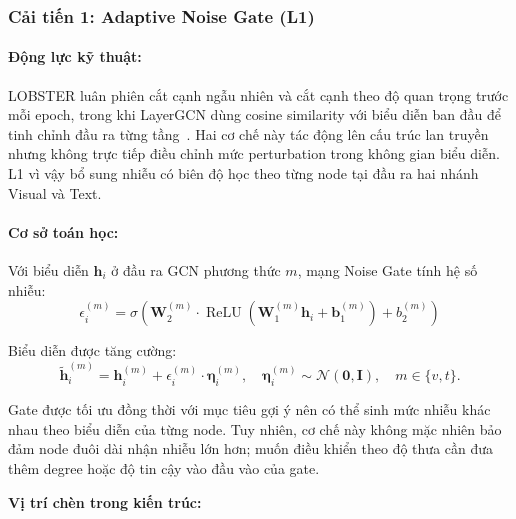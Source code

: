 \subsubsection{Cải tiến 1: Adaptive Noise Gate (L1)}

\paragraph{Động lực kỹ thuật:}
LOBSTER luân phiên cắt cạnh ngẫu nhiên và cắt cạnh theo độ quan trọng trước mỗi epoch, trong khi LayerGCN dùng cosine similarity với biểu diễn ban đầu để tinh chỉnh đầu ra từng tầng~\cite{xu2026lobster}. Hai cơ chế này tác động lên cấu trúc lan truyền nhưng không trực tiếp điều chỉnh mức perturbation trong không gian biểu diễn. L1 vì vậy bổ sung nhiễu có biên độ học theo từng node tại đầu ra hai nhánh Visual và Text.

\paragraph{Cơ sở toán học:}
Với biểu diễn $\mathbf{h}_i$ ở đầu ra GCN phương thức $m$, mạng Noise Gate tính hệ số nhiễu:
\begin{equation}
\epsilon_i^{(m)} = \sigma\!\left(\mathbf{W}_2^{(m)} \cdot \operatorname{ReLU}\!\left(\mathbf{W}_1^{(m)} \mathbf{h}_i + \mathbf{b}_1^{(m)}\right) + b_2^{(m)}\right)
\end{equation}

Biểu diễn được tăng cường:
\begin{equation}
\tilde{\mathbf{h}}_i^{(m)} = \mathbf{h}_i^{(m)} + \epsilon_i^{(m)} \cdot \boldsymbol{\eta}_i^{(m)},
\quad \boldsymbol{\eta}_i^{(m)} \sim \mathcal{N}(\mathbf{0}, \mathbf{I}),
\quad m\in\{v,t\}.
\end{equation}

Gate được tối ưu đồng thời với mục tiêu gợi ý nên có thể sinh mức nhiễu khác nhau theo biểu diễn của từng node. Tuy nhiên, cơ chế này không mặc nhiên bảo đảm node đuôi dài nhận nhiễu lớn hơn; muốn điều khiển theo độ thưa cần đưa thêm degree hoặc độ tin cậy vào đầu vào của gate.

\par\medskip
\noindent\textbf{Vị trí chèn trong kiến trúc:}\par
\nopagebreak[4]

